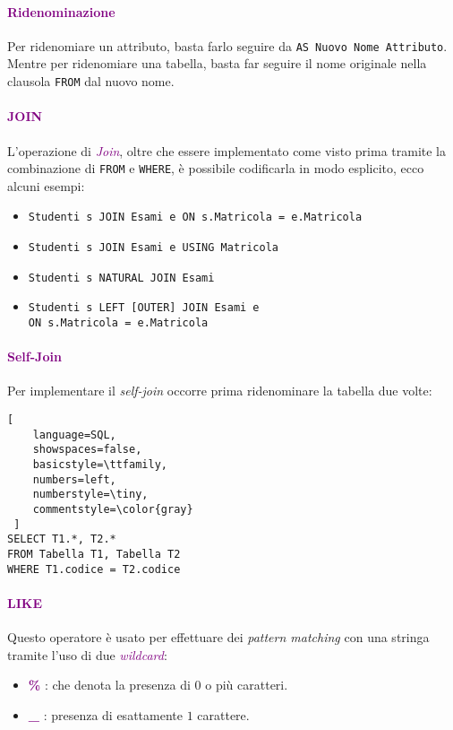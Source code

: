\paragraph{\textcolor{purple}{Ridenominazione}} Per ridenomiare un attributo, basta farlo seguire da
\verb|AS Nuovo Nome Attributo|.
Mentre per ridenomiare una tabella, basta far seguire il nome originale nella clausola \verb|FROM| dal nuovo nome.

\paragraph{\textcolor{purple}{JOIN}} L'operazione di \emph{\textcolor{purple}{Join}}, oltre che essere implementato
come visto prima tramite la combinazione di \verb|FROM| e \verb|WHERE|, è possibile codificarla in modo esplicito, ecco alcuni esempi:
\begin{itemize}
    \item \verb|Studenti s JOIN Esami e ON s.Matricola = e.Matricola|
    \item \verb|Studenti s JOIN Esami e USING Matricola|
    \item \verb|Studenti s NATURAL JOIN Esami|
    \item \verb|Studenti s LEFT [OUTER] JOIN Esami e| \\
        \verb|ON s.Matricola = e.Matricola|
\end{itemize}

\paragraph{\textcolor{purple}{Self-Join}} Per implementare il \emph{self-join} occorre prima ridenominare
la tabella due volte:
\begin{lstlisting}[
    language=SQL,
    showspaces=false,
    basicstyle=\ttfamily,
    numbers=left,
    numberstyle=\tiny,
    commentstyle=\color{gray}
 ]
SELECT T1.*, T2.*
FROM Tabella T1, Tabella T2
WHERE T1.codice = T2.codice
\end{lstlisting}

\paragraph{\textcolor{purple}{LIKE}} Questo operatore è usato per effettuare dei \emph{pattern matching} con una stringa
tramite l'uso di due \emph{\textcolor{purple}{wildcard}}:
\begin{itemize}
    \item \textbf{\textcolor{purple}{\%}} : che denota la presenza di $0$ o più caratteri.
    \item \textbf{\textcolor{purple}{\_}} : presenza di esattamente $1$ carattere.
\end{itemize}

